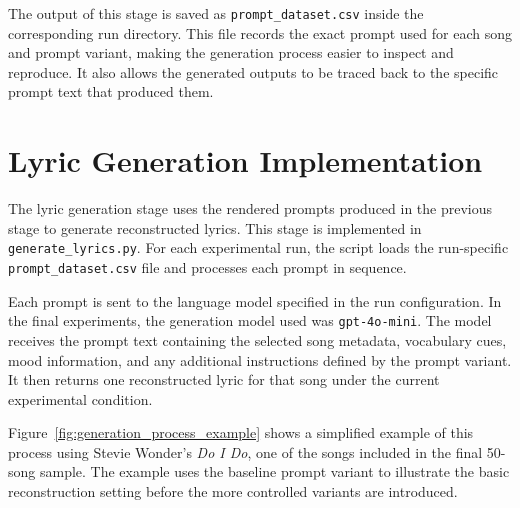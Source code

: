 The output of this stage is saved as \texttt{prompt\_dataset.csv} inside the corresponding run directory. This file records the exact prompt used for each song and prompt variant, making the generation process easier to inspect and reproduce. It also allows the generated outputs to be traced back to the specific prompt text that produced them.


\section{Lyric Generation Implementation}

The lyric generation stage uses the rendered prompts produced in the previous stage to generate reconstructed lyrics. This stage is implemented in \texttt{generate\_lyrics.py}. For each experimental run, the script loads the run-specific \texttt{prompt\_dataset.csv} file and processes each prompt in sequence.

Each prompt is sent to the language model specified in the run configuration. In the final experiments, the generation model used was \texttt{gpt-4o-mini}. The model receives the prompt text containing the selected song metadata, vocabulary cues, mood information, and any additional instructions defined by the prompt variant. It then returns one reconstructed lyric for that song under the current experimental condition.

Figure~\ref{fig:generation_process_example} shows a simplified example of this process using Stevie Wonder's \textit{Do I Do}, one of the songs included in the final 50-song sample. The example uses the baseline prompt variant to illustrate the basic reconstruction setting before the more controlled variants are introduced.

